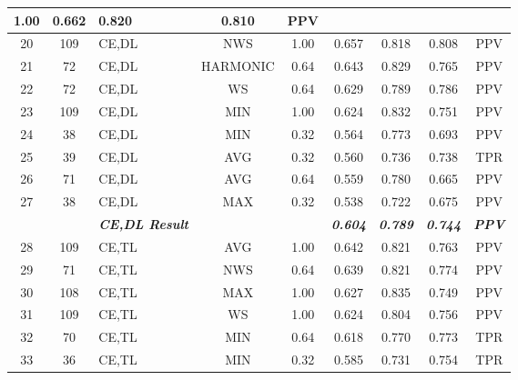 \begin{table}[H]
{\begin{tabular}{cc|l|cc|c|c|c|c|}
      1.00 &
      0.662 &
      0.820 &
      0.810 &
      PPV \\ \hline
    \multicolumn{1}{|c|}{20} &
      109 &
      CE,DL &
      \multicolumn{1}{c|}{NWS} &
      1.00 &
      0.657 &
      0.818 &
      0.808 &
      PPV \\ \hline
    \multicolumn{1}{|c|}{21} &
      72 &
      CE,DL &
      \multicolumn{1}{c|}{HARMONIC} &
      0.64 &
      0.643 &
      0.829 &
      0.765 &
      PPV \\ \hline
    \multicolumn{1}{|c|}{22} &
      72 &
      CE,DL &
      \multicolumn{1}{c|}{WS} &
      0.64 &
      0.629 &
      0.789 &
      0.786 &
      PPV \\ \hline
    \multicolumn{1}{|c|}{23} &
      109 &
      CE,DL &
      \multicolumn{1}{c|}{MIN} &
      1.00 &
      0.624 &
      0.832 &
      0.751 &
      PPV \\ \hline
    \multicolumn{1}{|c|}{24} &
      38 &
      CE,DL &
      \multicolumn{1}{c|}{MIN} &
      0.32 &
      0.564 &
      0.773 &
      0.693 &
      PPV \\ \hline
    \multicolumn{1}{|c|}{25} &
      39 &
      CE,DL &
      \multicolumn{1}{c|}{AVG} &
      0.32 &
      0.560 &
      0.736 &
      0.738 &
      TPR \\ \hline
    \multicolumn{1}{|c|}{26} &
      71 &
      CE,DL &
      \multicolumn{1}{c|}{AVG} &
      0.64 &
      0.559 &
      0.780 &
      0.665 &
      PPV \\ \hline
    \multicolumn{1}{|c|}{27} &
      38 &
      CE,DL &
      \multicolumn{1}{c|}{MAX} &
      0.32 &
      0.538 &
      0.722 &
      0.675 &
      PPV \\ \hline
     &
       &
      \textit{\textbf{CE,DL Result}} &
       &
       &
      \textit{\textbf{0.604}} &
      \textit{\textbf{0.789}} &
      \textit{\textbf{0.744}} &
      \textit{\textbf{PPV}} \\ \hline
      
      \multicolumn{1}{|c|}{28} &
      109 &
      CE,TL &
      \multicolumn{1}{c|}{AVG} &
      1.00 &
      0.642 &
      0.821 &
      0.763 &
      PPV \\ \hline
    \multicolumn{1}{|c|}{29} &
      71 &
      CE,TL &
      \multicolumn{1}{c|}{NWS} &
      0.64 &
      0.639 &
      0.821 &
      0.774 &
      PPV \\ \hline
    \multicolumn{1}{|c|}{30} &
      108 &
      CE,TL &
      \multicolumn{1}{c|}{MAX} &
      1.00 &
      0.627 &
      0.835 &
      0.749 &
      PPV \\ \hline
    \multicolumn{1}{|c|}{31} &
      109 &
      CE,TL &
      \multicolumn{1}{c|}{WS} &
      1.00 &
      0.624 &
      0.804 &
      0.756 &
      PPV \\ \hline
    \multicolumn{1}{|c|}{32} &
      70 &
      CE,TL &
      \multicolumn{1}{c|}{MIN} &
      0.64 &
      0.618 &
      0.770 &
      0.773 &
      TPR \\ \hline
    \multicolumn{1}{|c|}{33} &
      36 &
      CE,TL &
      \multicolumn{1}{c|}{MIN} &
      0.32 &
      0.585 &
      0.731 &
      0.754 &
      TPR \\ \hline


\end{tabular}}
\end{table}
